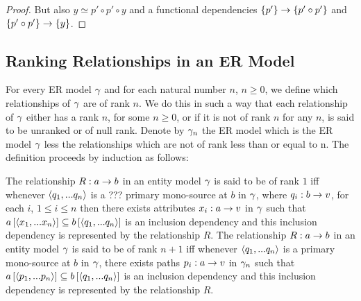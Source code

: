 \begin{newtt}
\begin{proof}
But also $y \simeq p' \circ p' \circ y$ and a functional dependencies $\left\{p'\right\} \rightarrow \left\{p' \circ p'\right\}$ and $\left\{p' \circ p'\right\} \rightarrow \left\{y\right\}$.
\end{proof}
\end{newtt}


\subsection{Ranking Relationships in an ER Model}
For every ER model $\gamma$ and for each natural number $n$, $n \geq 0$, we define which relationships of
$\gamma$ are of rank $n$. We do this  in such a way that each relationship of $\gamma$ either has a rank $n$, for some $n \geq 0$, or if it is not of rank 
$n$ for any $n$, is said to be unranked or of null rank. Denote by $\gamma_n$ the ER model which is the ER model 
$\gamma$ less the relationships which are not of rank less than or equal to n. The definition proceeds by induction as follows:
\begin{definition}
The relationship $R: a \rightarrow b$ in an entity model $\gamma$ is said to be of rank $1$ iff whenever 
$\langle q_1,...q_n\rangle$ is a  ??? primary mono-source at $b$ in $\gamma$, where $q_i:b \rightarrow v$, for each $i$, $1 \leq i \leq n$  then there exists attributes $x_i:a \rightarrow v$ in $\gamma$ such that $a\left[\langle x_1,...x_n\rangle\right]\subseteq b\left[\langle q_1,...q_n\rangle\right]$ is an inclusion dependency and this inclusion dependency is represented by the relationship $R$. 
The relationship $R: a \rightarrow b$ in an entity model $\gamma$ is said to be of rank $n+1$ iff whenever 
$\langle q_1,...q_n\rangle$ is a primary mono-source at $b$ in $\gamma$, there exists paths $p_i:a \rightarrow v$ in $\gamma_n$ such that $a\left[\langle p_1,...p_n\rangle\right]\subseteq b\left[\langle q_1,...q_n\rangle\right]$ is an inclusion dependency and this inclusion dependency  is represented by the relationship $R$. 
\end{definition}

